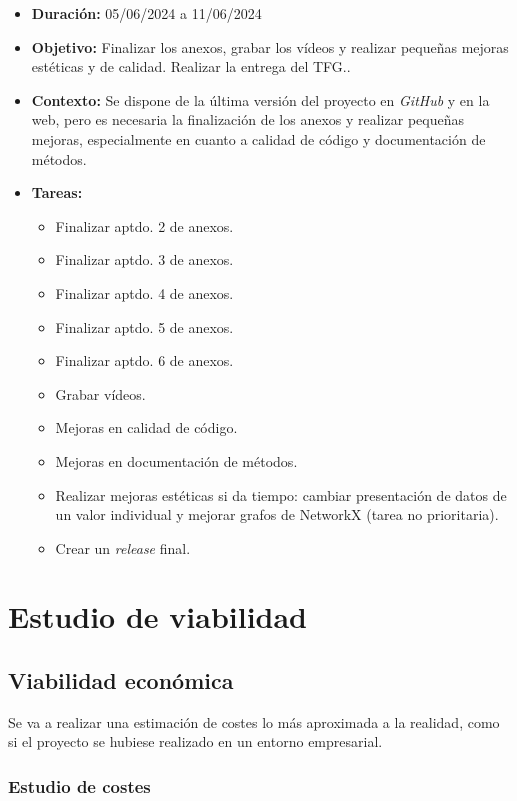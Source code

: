 \begin{itemize}
\item  
\textbf{Duración:} 05/06/2024 a 11/06/2024

\item
\textbf{Objetivo:} Finalizar los anexos, grabar los vídeos y realizar pequeñas mejoras estéticas y de calidad. Realizar la entrega del TFG.. 


\item
\textbf{Contexto:} Se dispone de la última versión del proyecto en \emph{GitHub} y en la web, pero es necesaria la finalización de los anexos y realizar pequeñas mejoras, especialmente en cuanto a calidad de código y documentación de métodos. 


\item
\textbf{Tareas:}
	\begin{itemize}
	\tightlist
	\item 
	Finalizar aptdo. 2 de anexos. 
	\item
	Finalizar aptdo. 3 de anexos. 
	\item
	Finalizar aptdo. 4 de anexos. 
	\item
	Finalizar aptdo. 5 de anexos. 
	\item
	Finalizar aptdo. 6 de anexos. 
	\item
	Grabar vídeos.
	\item
	Mejoras en calidad de código.
	\item
	Mejoras en documentación de métodos.
	\item
	Realizar mejoras estéticas si da tiempo: cambiar presentación de datos de un valor individual y mejorar grafos de NetworkX (tarea no prioritaria). 
	\item
	Crear un \emph{release} final.
  	\end{itemize}
\end{itemize}


\section{Estudio de viabilidad}

\subsection{Viabilidad económica}

Se va a realizar una estimación de costes lo más aproximada a la realidad, como si el proyecto se hubiese realizado en un entorno empresarial. 

\subsubsection{Estudio de costes}

